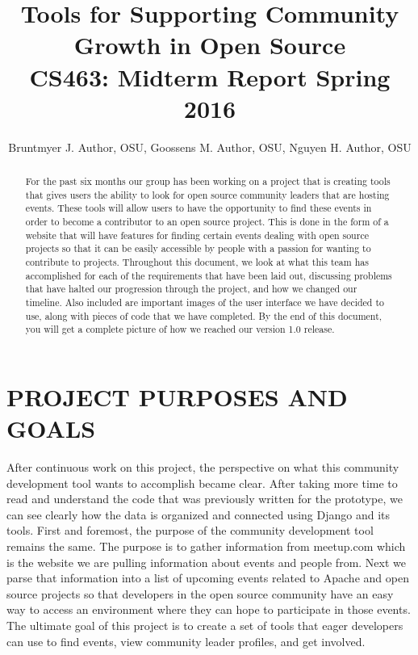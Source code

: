 \documentclass[draftclsnofoot,10pt,onecolumn]{IEEEtran} %
\begin{document}

\title{Tools for Supporting Community Growth in Open Source \\ {\large CS463: Midterm Report Spring 2016}}

\author{Bruntmyer J. Author, OSU, Goossens M. Author, OSU, Nguyen H. Author, OSU}



\maketitle
\begin{abstract}
For the past six months our group has been working on a project that is creating tools that
gives users the ability to look for open source community leaders that are
hosting events. These tools will allow
users to have the opportunity to find these events in order to become a
contributor to an open source project. This is done in the form of a website that
will have features for finding certain events dealing with open source projects
so that it can be easily accessible by people with a passion for wanting to
contribute to projects. Throughout this document, we look at what this team has
accomplished for each of the requirements that have been laid out, discussing problems
that have halted our progression through the project, and how we changed our timeline.
Also included are important images of the user interface we have decided
to use, along with pieces of code that we have completed. By the end of this document, 
you will get a complete picture of how we
reached our version 1.0 release.
\end{abstract}

\newpage


\section{PROJECT PURPOSES AND GOALS}
After continuous work on this project, the perspective on what
this community development tool wants to accomplish became clear. After taking
more time to read and understand the code that was previously written for the
prototype, we can see clearly how the data is organized and connected
using Django and its tools. First and foremost, the purpose of the community
development tool remains the same. The purpose is to gather information from
meetup.com which is the website we are pulling information about events and people from.
Next we parse that information into a list of upcoming events related to
Apache and open source projects so that developers in the open source community
have an easy way to access an environment where they can hope to participate in those
events. The ultimate goal of this project is to create a set of tools that eager developers
can use to find events, view community leader profiles, and get involved.
\end{document}
